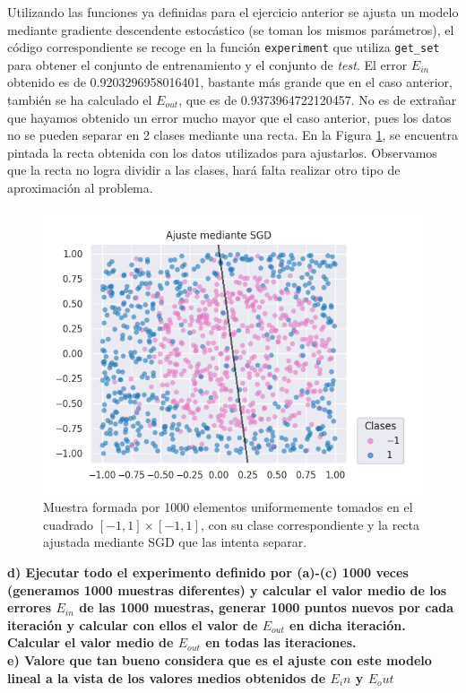 \documentclass[a4paper, 20pt]{article}
\begin{document}
Utilizando las funciones ya definidas para el ejercicio anterior se ajusta un modelo mediante gradiente descendente estocástico (se toman los mismos parámetros), el código correspondiente se recoge en la función \texttt{experiment} que utiliza \texttt{get\_set} para obtener el conjunto de entrenamiento y el conjunto de \textit{test}. El error $E_{in}$ obtenido es de 0.9203296958016401, bastante más grande que en el caso anterior, también se ha calculado el $E_{out}$, que es de 0.9373964722120457. No es de extrañar que hayamos obtenido un error mucho mayor que el caso anterior, pues los datos no se pueden separar en 2 clases mediante una recta. En la Figura \ref{fig:22c}, se encuentra pintada la recta obtenida con los datos utilizados para ajustarlos. Observamos que la recta no logra dividir a las clases, hará falta realizar otro tipo de aproximación al problema.

\begin{figure}[H]
    \centering
    \includegraphics[width=1\textwidth]{results22}
    \caption{Muestra formada por 1000 elementos uniformemente tomados en el cuadrado $[-1,1]\times[-1,1]$, con su clase correspondiente y la recta ajustada mediante SGD que las intenta separar.}
    \label{fig:22c}
\end{figure}

\textbf{d) Ejecutar todo el experimento definido por (a)-(c) 1000 veces (generamos 1000 muestras diferentes) y calcular el valor medio de los errores $E_{in}$ de las 1000 muestras, generar 1000 puntos nuevos por cada iteración y calcular con ellos el valor de $E_{out}$ en dicha iteración. Calcular el valor medio de $E_{out}$ en todas las iteraciones.\\ 
e) Valore que tan bueno considera que es el ajuste con este modelo lineal a la vista de los valores medios obtenidos de $E_in$ y $E_out$}
\end{document}
